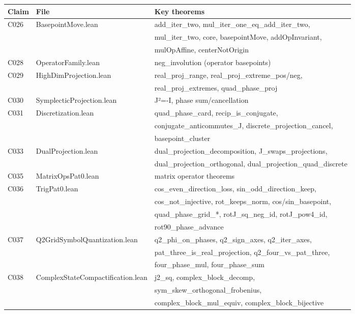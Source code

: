 \documentclass[sigplan,10pt,anonymous,review]{acmart}
\begin{document}
\begin{center}
\small
\begin{tabular}{lll}
\toprule
Claim & File & Key theorems \\
\midrule
C026 & BasepointMove.lean & add\_iter\_two, mul\_iter\_one\_eq\_add\_iter\_two,\\
     & & mul\_iter\_two, core, basepointMove, addOpInvariant,\\
     & & mulOpAffine, centerNotOrigin \\
C028 & OperatorFamily.lean & neg\_involution (operator basepoints) \\
C029 & HighDimProjection.lean & real\_proj\_range, real\_proj\_extreme\_pos/neg,\\
     & & real\_proj\_extremes, quad\_phase\_proj \\
C030 & SymplecticProjection.lean & J²=-I, phase sum/cancellation \\
C031 & Discretization.lean & quad\_phase\_card, recip\_is\_conjugate,\\
     & & conjugate\_anticommutes\_J, discrete\_projection\_cancel,\\
     & & basepoint\_cluster \\
C033 & DualProjection.lean & dual\_projection\_decomposition, J\_swaps\_projections,\\
     & & dual\_projection\_orthogonal, dual\_projection\_quad\_discrete \\
C035 & MatrixOpsPat0.lean & matrix operator theorems \\
C036 & TrigPat0.lean & cos\_even\_direction\_loss, sin\_odd\_direction\_keep,\\
     & & cos\_not\_injective, rot\_keeps\_norm, cos/sin\_basepoint,\\
     & & quad\_phase\_grid\_*, rotJ\_sq\_neg\_id, rotJ\_pow4\_id,\\
     & & rot90\_phase\_advance \\
C037 & Q2GridSymbolQuantization.lean & q2\_phi\_on\_phases, q2\_sign\_axes, q2\_iter\_axes,\\
     & & pat\_three\_is\_real\_projection, q2\_four\_vs\_pat\_three,\\
     & & four\_phase\_mul, four\_phase\_sum \\
C038 & ComplexStateCompactification.lean & j2\_sq, complex\_block\_decomp,\\
     & & sym\_skew\_orthogonal\_frobenius,\\
     & & complex\_block\_mul\_equiv, complex\_block\_bijective \\
\bottomrule
\end{tabular}
\end{center}



\end{document}

